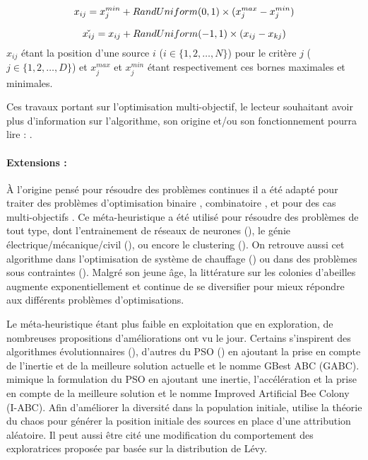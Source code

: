 \begin{equation}\label{eq:init_source}
  x_{ij} = x_{j}^{min} + RandUniform(0, 1) \times (x_{j}^{max} - x_{j}^{min}) \\
\end{equation}

\begin{equation}\label{eq:update_source}
  \check{x_{ij}} = x_{ij} + RandUniform(-1, 1) \times (x_{ij} - x_{kj}) \\
\end{equation}
$x_{ij}$ étant la position d’une source $i$ ($i \in \{1, 2, \dotsc, N\}$) pour le
critère $j$ ($j \in \{1, 2, \dotsc, D\}$) et $x_{j}^{max}$ et $x_{j}^{min}$
étant respectivement ces bornes maximales et minimales.

Ces travaux portant sur l’optimisation multi-objectif, le lecteur souhaitant avoir
plus d’information sur l’algorithme, son origine et/ou son fonctionnement pourra
lire : \cite{Karaboga201221,Aboul-EllaHassanien2015}.

\paragraph{Extensions :} %
\label{par:extensions}
À l’origine pensé pour résoudre des problèmes continues il a été adapté pour traiter des problèmes
d’optimisation binaire \cite{Kashan2012342}, combinatoire \cite{Karaboga20113021}, et pour des cas multi-objectifs
\cite{Akbari201239,Omkar2011489}.
Ce méta-heuristique a été utilisé pour résoudre des problèmes de tout type, dont l’entrainement de réseaux de
neurones (\cite{Karaboga2007}), le génie électrique/mécanique/civil (\cite{Rao2009887}), ou encore le clustering (\cite{Zhang20104761}).
On retrouve aussi cet algorithme dans l’optimisation de système de chauffage (\cite{Atashkari2011}) ou dans des problèmes sous
contraintes (\cite{Tsai201480,Karaboga20113021}).
Malgré son jeune âge, la littérature sur les colonies d’abeilles augmente exponentiellement et continue de se diversifier
pour mieux répondre aux différents problèmes d’optimisations.

Le méta-heuristique étant plus faible en exploitation que en exploration, de nombreuses
propositions d’améliorations ont vu le jour.
Certains s’inspirent des algorithmes évolutionnaires (\cite{Bi2011174,Zhao2010558}),
d’autres du PSO (\cite{Zhu20103166}) en ajoutant la prise en compte de l’inertie
et de la meilleure solution actuelle et le nomme GBest ABC (GABC). \cite{Li2012320}
mimique la formulation du PSO en ajoutant une inertie, l’accélération et la prise
en compte de la meilleure solution et le nomme Improved Artificial Bee Colony (I-ABC).
Afin d’améliorer la diversité dans la population initiale, \cite{Xiang20131256}
utilise la théorie du chaos pour générer la position initiale des sources en place
d’une attribution aléatoire. Il peut aussi être cité une modification du comportement
des exploratrices proposée par \cite{Sharma2012213} basée sur la distribution de
Lévy.

